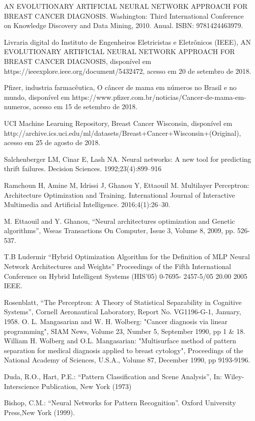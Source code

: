 \documentclass[conference]{IEEEtran}
\begin{document}
\begin{thebibliography}{00}

 AN EVOLUTIONARY ARTIFICIAL NEURAL NETWORK APPROACH FOR BREAST CANCER DIAGNOSIS. Washington: Third International Conference on Knowledge Discovery and Data Mining, 2010. Anual. ISBN: 9781424463979.

 Livraria digital do Instituto de Engenheiros Eletricistas e Eletrônicos (IEEE), AN EVOLUTIONARY ARTIFICIAL NEURAL NETWORK APPROACH FOR BREAST CANCER DIAGNOSIS, disponível em https://ieeexplore.ieee.org/document/5432472, acesso em 20 de setembro de 2018.

 Pfizer, industria farmacêutica, O câncer de mama em números no Brasil e no mundo, disponível em https://www.pfizer.com.br/noticias/Cancer-de-mama-em-numeros, acesso em 15 de setembro de 2018.

 UCI Machine Learning Repository, Breast Cancer Wisconsin, disponível em http://archive.ics.uci.edu/ml/datasets/Breast+Cancer+Wisconsin+(Original), acesso em 25 de agosto de 2018.

 Salchenberger LM, Cinar E, Lash NA. Neural networks: A new tool for predicting thrift failures. Decision Sciences. 1992;23(4):899–916

 Ramchoun H, Amine M, Idrissi J, Ghanou Y, Ettaouil M. Multilayer Perceptron: Architecture Optimization and Training. International Journal of Interactive Multimedia and Artificial Intelligence. 2016;4(1):26–30.

 M. Ettaouil and Y. Ghanou, “Neural architectures optimization and Genetic algorithms”, Wseas Transactions On Computer, Issue 3, Volume 8, 2009, pp. 526-537. 

 T.B Ludermir “Hybrid Optimization Algorithm for the Definition of MLP Neural Network Architectures and Weights” Proceedings of the Fifth International Conference on Hybrid Intelligent Systems (HIS’05) 0-7695- 2457-5/05 20.00 2005 IEEE.

 Rosenblatt, “The Perceptron: A Theory of Statistical Separability in Cognitive Systems”, Cornell Aeronautical Laboratory, Report No. VG1196-G-1, January, 1958. 
 O. L. Mangasarian and W. H. Wolberg: "Cancer          diagnosis via linear 
      programming", SIAM News, Volume 23, Number 5, September 1990, pp 1 & 18.
 William H. Wolberg and O.L. Mangasarian: "Multisurface method of pattern separation for medical diagnosis applied to breast cytology", Proceedings of the National Academy of Sciences, U.S.A., Volume 87, December 1990, pp 9193-9196.

 Duda, R.O., Hart, P.E.: “Pattern Classification and Scene Analysis”, In: Wiley-Interscience Publication, New York (1973)

 Bishop, C.M.: “Neural Networks for Pattern Recognition”. Oxford University Press,New York (1999).
\end{thebibliography}
\end{document}
